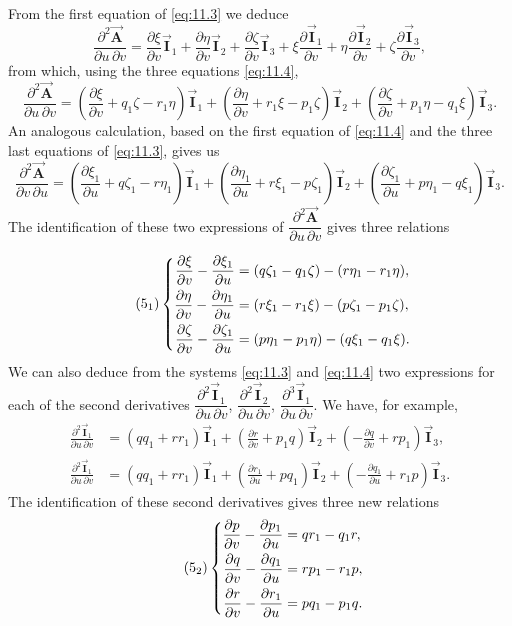 \documentclass[leqno,11pt]{book}
\numberwithin{equation}{chapter}
\newcommand{\pd}{\partial}
\theoremstyle{shape1}
\theoremstyle{shapesmall}
\newcommand{\rvec}[1]{\vec{\mathbf{#1}}}
\newcommand{\ivec}{\rvec{I}}
\begin{document}
From the first equation of \eqref{eq:11.3} we deduce
\[
\frac{\pd^{2}\vec{\mathbf{A}}}{\pd u\,\pd v}=
\frac{\pd\xi}{\pd v}\ivec_{1}+
\frac{\pd\eta}{\pd v}\ivec_{2}+
\frac{\pd\zeta}{\pd v}\ivec_{3}+
\xi\frac{\pd\ivec_{1}}{\pd v}+
\eta\frac{\pd\ivec_{2}}{\pd v}+
\zeta\frac{\pd\ivec_{3}}{\pd v},
\]
from which, using the three equations \eqref{eq:11.4},
\[
\frac{\pd^{2}\vec{\mathbf{A}}}{\pd u\,\pd v}=
\left(\frac{\pd\xi}{\pd v}+q_{1}\zeta-r_{1}\eta\right)\ivec_{1}+
\left(\frac{\pd\eta}{\pd v}+r_{1}\xi-p_{1}\zeta\right)\ivec_{2}+
\left(\frac{\pd\zeta}{\pd v}+p_{1}\eta-q_{1}\xi\right)\ivec_{3}.
\]
An analogous calculation, based on the first equation of \eqref{eq:11.4} and the three last equations of \eqref{eq:11.3}, gives us
\[
\frac{\pd^{2}\vec{\mathbf{A}}}{\pd v\,\pd u}=
\left(\frac{\pd\xi_{1}}{\pd u}+q\zeta_{1}-r\eta_{1}\right)\ivec_{1}+
\left(\frac{\pd\eta_{1}}{\pd u}+r\xi_{1}-p\zeta_{1}\right)\ivec_{2}+
\left(\frac{\pd\zeta_{1}}{\pd u}+p\eta_{1}-q\xi_{1}\right)\ivec_{3}.
\]
The identification of these two expressions of $\dfrac{\pd^{2}\vec{\mathbf{A}}}{\pd u\,\pd v}$ gives three relations
\addtocounter{equation}{1}
\begin{equation}
  \label{eq:11.5-1}\tag{$5_{1}$}
  \left\{
    \begin{aligned}
      \frac{\pd\xi}{\pd v}-\frac{\pd\xi_{1}}{\pd u}&=(q\zeta_{1}-q_{1}\zeta)-(r\eta_{1}-r_{1}\eta),\\
      \frac{\pd\eta}{\pd v}-\frac{\pd\eta_{1}}{\pd u}&=(r\xi_{1}-r_{1}\xi)-(p\zeta_{1}-p_{1}\zeta),\\
      \frac{\pd\zeta}{\pd v}-\frac{\pd\zeta_{1}}{\pd u}&=(p\eta_{1}-p_{1}\eta)-(q\xi_{1}-q_{1}\xi).
    \end{aligned}
  \right.
\end{equation}
We can also deduce from the systems \eqref{eq:11.3} and \eqref{eq:11.4} two expressions for each of the second derivatives $\dfrac{\pd^{2}\ivec_{1}}{\pd u\,\pd v}$, $\dfrac{\pd^{2}\ivec_{2}}{\pd u\,\pd v}$, $\dfrac{\pd^{3}\ivec_{1}}{\pd u\,\pd v}$. We have, for example,
\begin{align*}
\frac{\pd^{2}\ivec_{1}}{\pd u\,\pd v}&=
\left(qq_{1}+rr_{1}\right)\ivec_{1}+
\left(\frac{\pd r}{\pd v}+p_{1}q\right)\ivec_{2}+
\left(-\frac{\pd q}{\pd v}+rp_{1}\right)\ivec_{3},\\
\frac{\pd^{2}\ivec_{1}}{\pd u\,\pd v}&=
\left(qq_{1}+rr_{1}\right)\ivec_{1}+
\left(\frac{\pd r_{1}}{\pd u}+pq_{1}\right)\ivec_{2}+
\left(-\frac{\pd q_{1}}{\pd u}+r_{1}p\right)\ivec_{3}.
\end{align*}
The identification of these second derivatives gives three new relations
\begin{equation}
  \label{eq:11.5-2}\tag{$5_{2}$}
  \left\{
    \begin{aligned}
      \frac{\pd p}{\pd v}-\frac{\pd p_{1}}{\pd u}&=qr_{1}-q_{1}r,\\
      \frac{\pd q}{\pd v}-\frac{\pd q_{1}}{\pd u}&=rp_{1}-r_{1}p,\\
      \frac{\pd r}{\pd v}-\frac{\pd r_{1}}{\pd u}&=pq_{1}-p_{1}q.
    \end{aligned}
  \right.
\end{equation}
\end{document}
